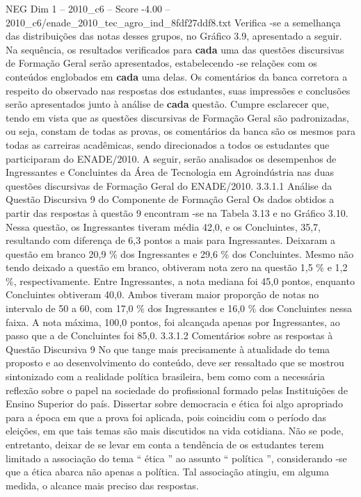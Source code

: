 \begin{textsample}{NEG Dim 1 – 2010\_c6 – Score -4.00 – 2010\_c6/enade\_2010\_tec\_agro\_ind\_8fdf27ddf8.txt}
Verifica -se a semelhança das distribuições das notas desses grupos, no Gráfico 3.9, apresentado a seguir.
Na sequência, os resultados verificados para \textbf{cada} uma das questões discursivas de Formação Geral serão apresentados, estabelecendo -se relações com os conteúdos englobados em \textbf{cada} uma delas.
Os comentários da banca corretora a respeito do observado nas respostas dos estudantes, suas impressões e conclusões serão apresentados junto à análise de \textbf{cada} questão.
Cumpre esclarecer que, tendo em vista que as questões discursivas de Formação Geral são padronizadas, ou seja, constam de todas as provas, os comentários da banca são os mesmos para todas as carreiras acadêmicas, sendo direcionados a todos os estudantes que participaram do ENADE/2010.
A seguir, serão analisados os desempenhos de Ingressantes e Concluintes da Área de Tecnologia em Agroindústria nas duas questões discursivas de Formação Geral do ENADE/2010. 3.3.1.1 Análise da Questão Discursiva 9 do Componente de Formação Geral Os dados obtidos a partir das respostas à questão 9 encontram -se na Tabela 3.13 e no Gráfico 3.10.
Nessa questão, os Ingressantes tiveram média 42,0, e os Concluintes, 35,7, resultando com diferença de 6,3 pontos a mais para Ingressantes.
Deixaram a questão em branco 20,9 \% dos Ingressantes e 29,6 \% dos Concluintes.
Mesmo não tendo deixado a questão em branco, obtiveram nota zero na questão 1,5 \% e 1,2 \%, respectivamente.
Entre Ingressantes, a nota mediana foi 45,0 pontos, enquanto Concluintes obtiveram 40,0.
Ambos tiveram maior proporção de notas no intervalo de 50 a 60, com 17,0 \% dos Ingressantes e 16,0 \% dos Concluintes nessa faixa.
A nota máxima, 100,0 pontos, foi alcançada apenas por Ingressantes, ao passo que a de Concluintes foi 85,0. 3.3.1.2 Comentários sobre as respostas à Questão Discursiva 9 No que tange mais precisamente à atualidade do tema proposto e ao desenvolvimento do conteúdo, deve ser ressaltado que se mostrou sintonizado com a realidade política brasileira, bem como com a necessária reflexão sobre o papel na sociedade do profissional formado pelas Instituições de Ensino Superior do país.
Dissertar sobre democracia e ética foi algo apropriado para a época em que a prova foi aplicada, pois coincidiu com o período das eleições, em que tais temas são mais discutidos na vida cotidiana.
Não se pode, entretanto, deixar de se levar em conta a tendência de os estudantes terem limitado a associação do tema “ ética ” ao assunto “ política ”, considerando -se que a ética abarca não apenas a política.
Tal associação atingiu, em alguma medida, o alcance mais preciso das respostas.

\end{textsample}
